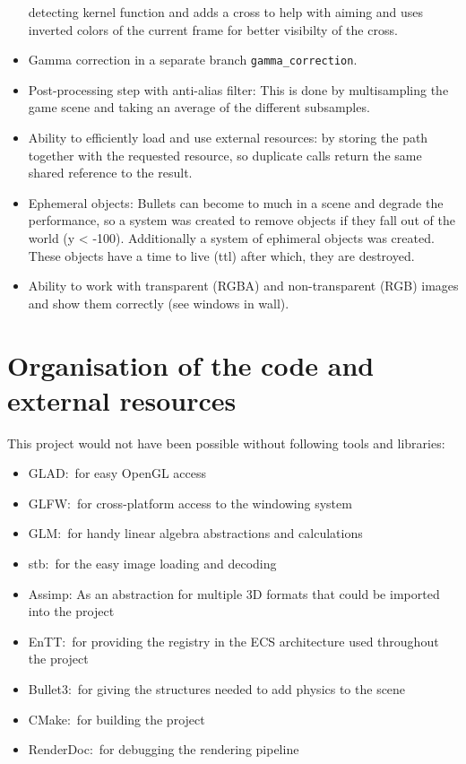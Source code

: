 \documentclass[]{article}
\begin{document}
\begin{itemize}
            detecting kernel function and adds a cross to help with aiming and uses
            inverted colors of the current frame for better visibilty of the cross.
      \item Gamma correction in a separate branch \verb|gamma_correction|.
      \item Post-processing step with anti-alias filter: This is done by
            multisampling the game scene and taking an average of the different
            subsamples.
      \item Ability to efficiently load and use external resources: by storing the
            path together with the requested resource, so duplicate calls return
            the same shared reference to the result.
      \item Ephemeral objects: Bullets can become to much in a scene and degrade
            the performance, so a system was created to remove objects if they
            fall out of the world (y < -100). Additionally a system of ephimeral
            objects was created.  These objects have a time to live (ttl) after
            which, they are destroyed.
      \item Ability to work with transparent (RGBA) and non-transparent (RGB)
            images and show them correctly (see windows in wall).
\end{itemize}

\section{Organisation of the code and external resources}

This project would not have been possible without following tools and libraries:
\begin{itemize}
      \item GLAD:\ for easy OpenGL access
      \item GLFW:\ for cross-platform access to the windowing system
      \item GLM:\ for handy linear algebra abstractions and calculations
      \item stb:\ for the easy image loading and decoding
      \item Assimp: As an abstraction for multiple 3D formats that could be
            imported into the project
      \item EnTT:\ for providing the registry in the ECS architecture used
            throughout the project
      \item Bullet3:\ for giving the structures needed to add physics to the scene
      \item CMake:\ for building the project
      \item RenderDoc:\ for debugging the rendering pipeline
\end{itemize}
\end{document}
